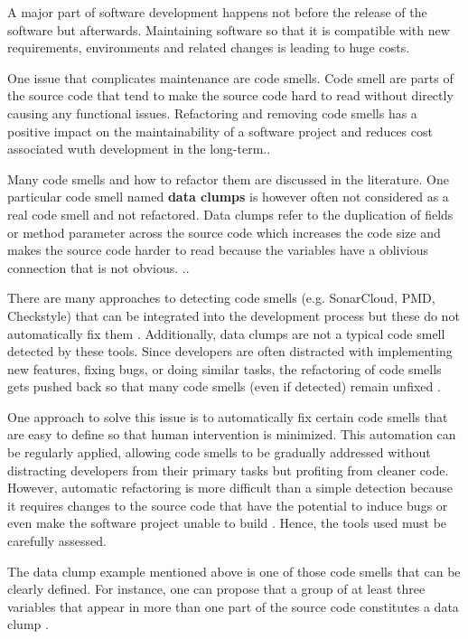 \label{sec:introduction}
A major part of software development happens not before the release of the software but afterwards. Maintaining software so that it is compatible with new requirements, environments and related changes is leading to huge costs.

One issue that complicates maintenance are code smells. Code smell are parts of the source code that tend to make the source code hard to read without directly causing any functional issues. Refactoring and removing code smells has a positive impact on the maintainability  of a software project and reduces cost associated wuth development in the long-term.\cite{mealyEvaluatingSoftwareRefactoring2006}.

Many code smells and how to refactor them are discussed in the literature. One particular code smell named \textbf{data clumps} is however often not considered as a real code smell and not refactored. Data clumps refer to the duplication of fields or method parameter across the source code which increases the code size and makes the source code harder to read because the variables have a oblivious connection that is not obvious.  \cite{BaumgartnerAP23}  \cite{data_clumps_refactoring_guru} \cite{join_data_items}..



There are many approaches to detecting code smells (e.g. SonarCloud,  PMD, Checkstyle) that can be integrated into the development process but these do not automatically fix them  \cite{vidalApproachPrioritizeCode2016}.  Additionally, data clumps are not a typical code smell detected by these tools. 
Since developers are often distracted with implementing new features, fixing bugs, or doing similar tasks, the refactoring of code smells gets pushed back so that many code smells (even if detected) remain unfixed   \cite{10.1145/2393596.2393655}.


One approach to solve this issue is to automatically fix certain code smells that are easy to define so that human intervention is minimized. This automation can be regularly applied, allowing code smells to be gradually addressed without distracting developers from their primary tasks but profiting from cleaner code. 
However,  automatic refactoring  is more difficult than a simple detection because it requires changes to the source code that have the potential to induce bugs or even make the software project unable to build \cite{9796303}. Hence, the tools used must be carefully assessed. 

The data clump example mentioned above is one of those code smells that can be clearly defined. For instance, one can propose that a group of at least three variables that appear in more than one part of the source code constitutes a data clump \cite{zhangImprovingPrecisionFowler2008}.




